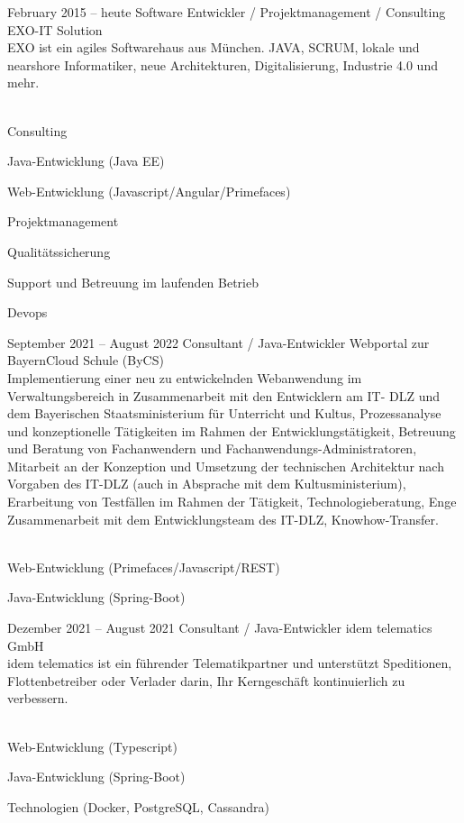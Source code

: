 \documentclass[fontsize=10pt]{tccv}
\begin{document}
\begin{eventlist}

\item{February 2015 -- heute}
     { Software Entwickler / Projektmanagement /  Consulting}
     {EXO-IT Solution}
\\
EXO ist ein agiles Softwarehaus aus München. JAVA, SCRUM, lokale und nearshore Informatiker, neue Architekturen, Digitalisierung, Industrie 4.0 und mehr.
\\\\
\begin{assignments}
\item{Consulting}
\item{Java-Entwicklung (Java EE)}
\item{Web-Entwicklung (Javascript/Angular/Primefaces)}
\item{Projektmanagement}
\item{Qualitätssicherung}
\item{Support und Betreuung im laufenden Betrieb }
\item{Devops}
\end{assignments}

\item{September 2021 -- August 2022}
     {Consultant / Java-Entwickler}
     {Webportal zur BayernCloud Schule (ByCS)}
\\
Implementierung einer neu zu entwickelnden Webanwendung im
Verwaltungsbereich in Zusammenarbeit mit den Entwicklern am IT-
DLZ und dem Bayerischen Staatsministerium für Unterricht und
Kultus, Prozessanalyse und konzeptionelle Tätigkeiten im Rahmen
der Entwicklungstätigkeit, Betreuung und Beratung von
Fachanwendern und Fachanwendungs-Administratoren, Mitarbeit an
der Konzeption und Umsetzung der technischen Architektur nach
Vorgaben des IT-DLZ (auch in Absprache mit dem
Kultusministerium), Erarbeitung von Testfällen im Rahmen der
Tätigkeit, Technologieberatung, Enge Zusammenarbeit mit dem
Entwicklungsteam des IT-DLZ, Knowhow-Transfer.
\\\\
\begin{assignments}
\item{Web-Entwicklung (Primefaces/Javascript/REST)}
\item{Java-Entwicklung (Spring-Boot)}
\end{assignments}

\item{Dezember 2021 -- August 2021}
     {Consultant / Java-Entwickler}
     {idem telematics GmbH}
\\
idem telematics ist ein führender Telematikpartner und unterstützt Speditionen,
Flottenbetreiber oder Verlader darin, Ihr Kerngeschäft kontinuierlich zu verbessern.
\\\\
\begin{assignments}
\item{Web-Entwicklung (Typescript)}
\item{Java-Entwicklung (Spring-Boot)}
\item{Technologien (Docker, PostgreSQL, Cassandra)}
\end{assignments}


\end{eventlist}
\end{document}

